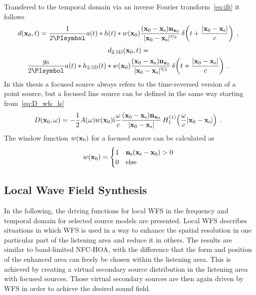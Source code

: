 Transfered to the temporal domain via an inverse Fourier transform~\eqref{eq:ift} it follows
%
\begin{equation}
    d(\x_0,t) = \frac{1}{2\PI} a(t) * h(t) * w(\x_0)
    \frac{(\x_0-\xs)\n_{\x_0}}{|\x_0-\xs|^{\nicefrac{3}{2}}}
    \deltafunc{t+\frac{|\x_0-\xs|}{c}} \qc
    \label{eq:d_wfs_fs}
\end{equation}
%
\begin{multline}
    d_\twohalfD(\x_0,t) = \\
    \frac{g_0}{2\PI} a(t) * h_\twohalfD(t) * w(\x_0)
    \frac{(\x_0-\xs)\n_{\x_0}}{|\x_0-\xs|^{\nicefrac{3}{2}}}
    \deltafunc{t+\frac{|\x_0-\xs|}{c}} \qp
    \label{eq:d_wfs_fs_25D}
\end{multline}
%
In this thesis a focused source always refers to the time-reversed
version of a point source, but a focused line source can be defined in the
same way starting from~\eqref{eq:D_wfs_ls}
%
\begin{equation}
    D(\x_0,\omega) = -\frac{1}{2}A(\omega) w(\x_0) \I\omegac
    \frac{(\x_0-\xs)\n_{\x_0}}{|\x_0-\xs|}
    \H{1}{1}\left(\omegac|\x_0-\xs|\right) \qp
    \label{eq:D_wfs_ls_fs}
\end{equation}
%
The window function $w(\mathbf{x}_0)$ for a focused source can be
calculated as
%
\begin{equation}
    w(\x_0) = 
    \begin{cases}
        1 & \n_\text{s} (\xs-\x_0) > 0 \\
        0 & \text{else}
    \end{cases}
    \label{eq:w_fs}
\end{equation}
%



\subsection{Local Wave Field Synthesis}
\label{sec:driving_functions_localwfs}

In the following, the driving functions for local \ac{WFS} in the frequency and
temporal domain
for selected source models are presented.
Local \ac{WFS} describes situations in which \ac{WFS} is used in a way to
enhance the spatial resolution in one particular part of the listening area and
reduce it in others. The results are similar to band-limited \ac{NFC-HOA}, with
the difference that the form and position of the enhanced area can freely be
chosen within the listening area.
This is achieved by creating a virtual secondary source distribution in the
listening area with focused sources. Those virtual secondary sources are then
again driven by \ac{WFS} in order to achieve the desired sound field.

